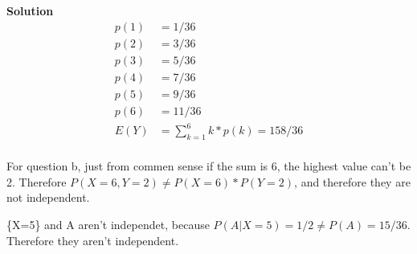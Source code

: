 \documentclass{article}
\begin{document}
\textbf{Solution}
\\
\begin{align*}
    p(1)&=1/36\\
    p(2)&=3/36\\
    p(3)&=5/36\\
    p(4)&=7/36\\
    p(5)&=9/36\\
    p(6)&=11/36\\
    E(Y)&= \sum_{k=1}^{6} k*p(k)= 158/36\\ 
\end{align*}

For question b, just from commen sense if the sum is 6, the highest value can't be 2. 
Therefore $P(X=6,Y=2) \neq P(X=6) * P(Y=2)$, and therefore they are not independent.

\{X=5\} and A aren't independet, because $P(A\vert X=5)=1/2 \neq P(A) = 15/36$. Therefore they 
aren't independent.
\end{document}
